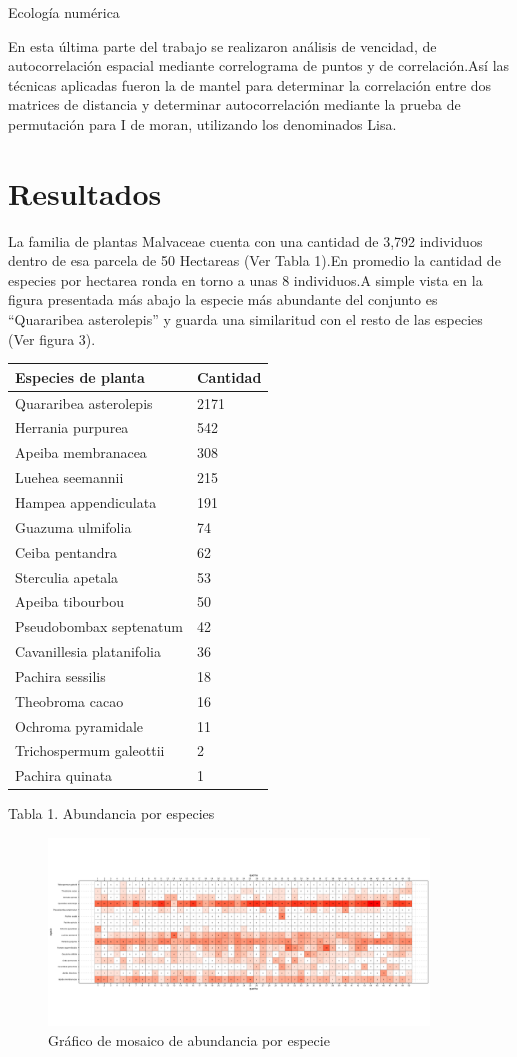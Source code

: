 \documentclass[11pt,]{article}
\begin{document}
Ecología numérica

En esta última parte del trabajo se realizaron análisis de vencidad, de
autocorrelación espacial mediante correlograma de puntos y de
correlación.Así las técnicas aplicadas fueron la de mantel para
determinar la correlación entre dos matrices de distancia y determinar
autocorrelación mediante la prueba de permutación para I de moran,
utilizando los denominados Lisa.

\section{Resultados}\label{resultados}

La familia de plantas Malvaceae cuenta con una cantidad de 3,792
individuos dentro de esa parcela de 50 Hectareas (Ver Tabla 1).En
promedio la cantidad de especies por hectarea ronda en torno a unas 8
individuos.A simple vista en la figura presentada más abajo la especie
más abundante del conjunto es ``Quararibea asterolepis'' y guarda una
similaritud con el resto de las especies (Ver figura 3).

\begin{longtable}[]{@{}ll@{}}
\toprule
Especies de planta & Cantidad\tabularnewline
\midrule
\endhead
Quararibea asterolepis & 2171\tabularnewline
Herrania purpurea & 542\tabularnewline
Apeiba membranacea & 308\tabularnewline
Luehea seemannii & 215\tabularnewline
Hampea appendiculata & 191\tabularnewline
Guazuma ulmifolia & 74\tabularnewline
Ceiba pentandra & 62\tabularnewline
Sterculia apetala & 53\tabularnewline
Apeiba tibourbou & 50\tabularnewline
Pseudobombax septenatum & 42\tabularnewline
Cavanillesia platanifolia & 36\tabularnewline
Pachira sessilis & 18\tabularnewline
Theobroma cacao & 16\tabularnewline
Ochroma pyramidale & 11\tabularnewline
Trichospermum galeottii & 2\tabularnewline
Pachira quinata & 1\tabularnewline
\bottomrule
\end{longtable}

Tabla 1. Abundancia por especies

\begin{figure}
\centering
\includegraphics[width=0.90000\textwidth]{mosaico_variable.png}
\caption{Gráfico de mosaico de abundancia por especie}
\end{figure}
\end{document}
